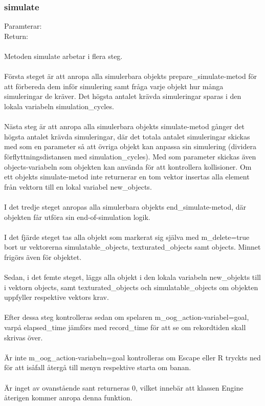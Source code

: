 \documentclass{TDP003mall}
\begin{document}
\subsubsection{simulate}
Paramterar: \textit{}
\\Return: \textit{}
\\\\
Metoden simulate arbetar i flera steg.
\\\\
Första steget är att anropa alla simulerbara objekts prepare\_simulate-metod för att förbereda dem inför simulering samt fråga varje objekt hur många simuleringar de kräver. Det högsta antalet krävda simuleringar sparas i den lokala variabeln simulation\_cycles.
\\\\
Nästa steg är att anropa alla simulerbara objekts simulate-metod gånger det högsta antalet krävda simuleringar, där det totala antalet simuleringar skickas med som en parameter så att övriga objekt kan anpassa sin simulering (dividera förflyttningsdistansen med simulation\_cycles). Med som parameter skickas även objects-variabeln som objekten kan använda för att kontrollera kollisioner. Om ett objekts simulate-metod inte returnerar en tom vektor insertas alla element från vektorn till en lokal variabel new\_objects.
\\\\
I det tredje steget anropas alla simulerbara objekts end\_simulate-metod, där objekten får utföra sin end-of-simulation logik.
\\\\
I det fjärde steget tas alla objekt som markerat sig själva med m\_delete=true bort ur vektorerna simulatable\_objects, texturated\_objects samt objects. Minnet frigörs även för objektet.
\\\\
Sedan, i det femte steget, läggs alla objekt i den lokala variabeln new\_objekts till i vektorn objects, samt texturated\_objects och simulatable\_objects om objekten uppfyller respektive vektors krav.
\\\\
Efter dessa steg kontrolleras sedan om spelaren m\_oog\_action-variabel=goal, varpå elapsed\_time jämförs med record\_time för att se om rekordtiden skall skrivas över.
\\\\
Är inte m\_oog\_action-variabeln=goal kontrolleras om Escape eller R tryckts ned för att isåfall återgå till menyn respektive starta om banan.
\\\\
Är inget av ovanstående sant returneras 0, vilket innebär att klassen Engine återigen kommer anropa denna funktion.
\end{document}
